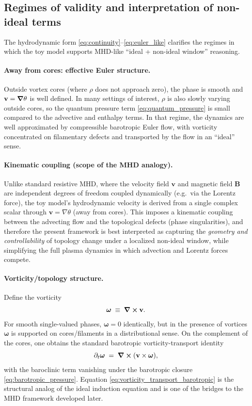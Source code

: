 \documentclass[11pt]{article}
\theoremstyle{plain}
\theoremstyle{definition}
\theoremstyle{remark}
\newcommand{\B}{\mathbf{B}}
\newcommand{\vfield}{\mathbf{v}}
\newcommand{\omegaV}{\boldsymbol{\omega}}
\begin{document}
\subsection{Regimes of validity and interpretation of non-ideal terms}\label{sec:toy_model_regime}
The hydrodynamic form \eqref{eq:continuity}--\eqref{eq:euler_like} clarifies the regimes in which the toy model supports MHD-like ``ideal + non-ideal window'' reasoning.

\paragraph{Away from cores: effective Euler structure.}
Outside vortex cores (where $\rho$ does not approach zero), the phase is smooth and $\vfield=\grad\theta$ is well defined. In many settings of interest, $\rho$ is also slowly varying outside cores, so the quantum pressure term \eqref{eq:quantum_pressure} is small compared to the advective and enthalpy terms. In that regime, the dynamics are well approximated by compressible barotropic Euler flow, with vorticity concentrated on filamentary defects and transported by the flow in an ``ideal'' sense.

\paragraph{Kinematic coupling (scope of the MHD analogy).}
Unlike standard resistive MHD, where the velocity field $\vfield$ and magnetic field $\B$ are independent degrees of freedom coupled dynamically (e.g.\ via the Lorentz force), the toy model's hydrodynamic velocity is derived from a single complex scalar through $\vfield=\nabla\theta$ (away from cores). This imposes a kinematic coupling between the advecting flow and the topological defects (phase singularities), and therefore the present framework is best interpreted as capturing the \emph{geometry and controllability} of topology change under a localized non-ideal window, while simplifying the full plasma dynamics in which advection and Lorentz forces compete.

\paragraph{Vorticity/topology structure.}
Define the vorticity
\begin{equation}\label{eq:vorticity_def}
  \omegaV \;\equiv\; \curl \vfield.
\end{equation}
For smooth single-valued phases, $\omegaV=0$ identically, but in the presence of vortices $\omegaV$ is supported on cores/filaments in a distributional sense. On the complement of the cores, one obtains the standard barotropic vorticity-transport identity
\begin{equation}\label{eq:vorticity_transport_barotropic}
  \partial_t \omegaV \;=\; \curl(\vfield \times \omegaV),
\end{equation}
with the baroclinic term vanishing under the barotropic closure \eqref{eq:barotropic_pressure}. Equation \eqref{eq:vorticity_transport_barotropic} is the structural analog of the ideal induction equation and is one of the bridges to the MHD framework developed later.
\end{document}
